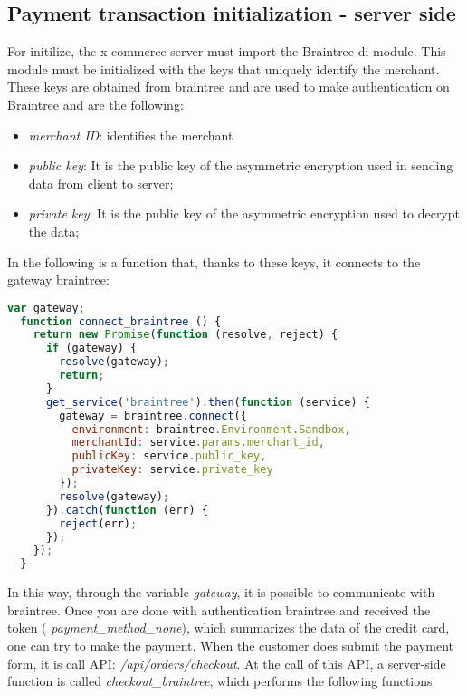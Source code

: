 \subsection{Payment transaction initialization - server side}
For initilize, the x-commerce server must import the Braintree di module.
This module must be initialized with the keys that uniquely identify the merchant.
\newline
These keys are obtained from braintree and are used to make authentication on Braintree and are the following:
\begin{itemize}
\item \emph{merchant ID}: identifies the merchant
\item \emph{public key}: It is the public key of the asymmetric encryption used in sending data from client to server;
\item \emph{private key}: It is the public key of the asymmetric encryption used to decrypt the data;
\end{itemize}
In the following is a function that, thanks to these keys, it connects to the gateway braintree:
\begin{lstlisting}[language=javascript]
  var gateway;
  function connect_braintree () {
    return new Promise(function (resolve, reject) {
      if (gateway) {
        resolve(gateway);
        return;
      }
      get_service('braintree').then(function (service) {
        gateway = braintree.connect({
          environment: braintree.Environment.Sandbox,
          merchantId: service.params.merchant_id,
          publicKey: service.public_key,
          privateKey: service.private_key
        });
        resolve(gateway);
      }).catch(function (err) {
        reject(err);
      });
    });
  }
\end{lstlisting}
In this way, through the variable \emph{gateway}, it is possible to communicate with braintree.
\newline
Once you are done with authentication braintree and received the token ( \emph{payment\_method\_none}), which summarizes the data of the credit card, one can try to make the payment.
\newline
When the customer does submit the payment form, it is call API: \emph{/api/orders/checkout}.
At the call of this API, a server-side function is called \emph{checkout\_braintree}, which performs the following functions:
